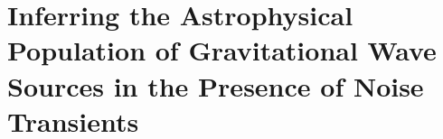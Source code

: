 %
%
%
%
%
%
%
%
\chapter{Inferring the Astrophysical Population of Gravitational Wave Sources in the Presence of Noise Transients}

